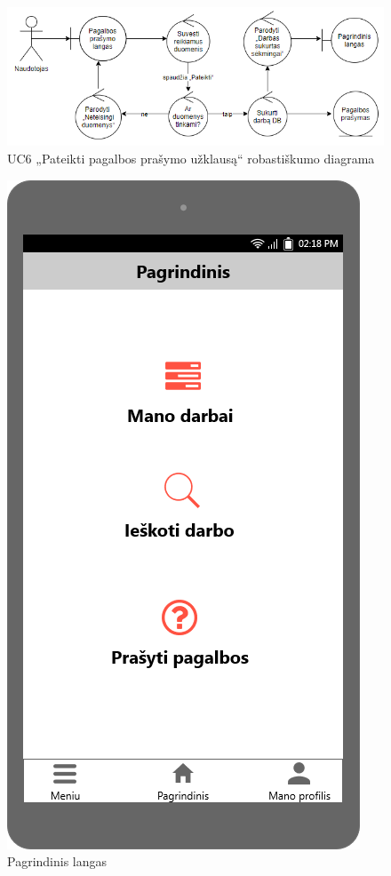 \documentclass{VUMIFPSbakalaurinis}
\begin{document}
\begin{figure}[H]
	\centering
	\includegraphics[scale=0.6]{img/Robustness/UC6}
	\caption{UC6 „Pateikti pagalbos prašymo užklausą“ robastiškumo diagrama}
	\label{img:uc6rob}
\end{figure}

\begin{figure}[H]
	\centering
	\includegraphics[scale=0.4]{img/ScreenShots/12-Pagrindinis-langas}
	\caption{Pagrindinis langas}
	\label{img:main}
\end{figure}
\end{document}
